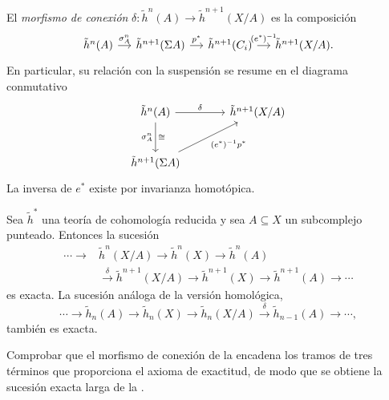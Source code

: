 \begin{defi}\label{defi:conexion}
El \emph{morfismo de conexión} $\delta\colon\tilde h^n(A)\to\tilde h^{n+1}(X/A)$ es la composición
\[
\begin{tikzcd}[column sep=small]
\tilde h^n(A) \arrow[r,"\sigma^n_A"] & \tilde h^{n+1}(\Sigma A) \arrow[r,"p^*"] & \tilde h^{n+1}(C_i) \arrow[r,"(e^*)^{-1}"] & \tilde h^{n+1}(X/A).
\end{tikzcd}
\]
En particular, su relación con la suspensión se resume en el diagrama conmutativo
\[
\begin{tikzcd}[column sep=large,row sep=large]
\tilde h^n(A) \arrow[r,"\delta"] \arrow[d,"\sigma^n_A"',"\cong"] & \tilde h^{n+1}(X/A)\\
\tilde h^{n+1}(\Sigma A) \arrow[ur,"{(e^*)^{-1}p^*}"'] &
\end{tikzcd}
\]
La inversa de $e^*$ existe por invarianza homotópica.
\end{defi}

\begin{prop}\label{prop:les}
Sea $\tilde h^*$ una teoría de cohomología reducida y sea $A\subseteq X$ un subcomplejo punteado. Entonces la sucesión
\[
\begin{aligned}
\cdots\longrightarrow{}&\tilde h^n(X/A)\longrightarrow\tilde h^n(X)\longrightarrow\tilde h^n(A)\\
&\xrightarrow{\ \delta\ }\tilde h^{n+1}(X/A)\longrightarrow\tilde h^{n+1}(X)\longrightarrow\tilde h^{n+1}(A)\longrightarrow\cdots
\end{aligned}
\]
es exacta. La sucesión análoga de la versión homológica,
\[
\cdots\to\tilde h_n(A)\to\tilde h_n(X)\to\tilde h_n(X/A)\xrightarrow{\ \delta\ }\tilde h_{n-1}(A)\to\cdots,
\]
también es exacta.
\end{prop}

\begin{ejer}
Comprobar que el morfismo de conexión de la  encadena los tramos de tres términos que proporciona el axioma de exactitud, de modo que se obtiene la sucesión exacta larga de la .
\end{ejer}

